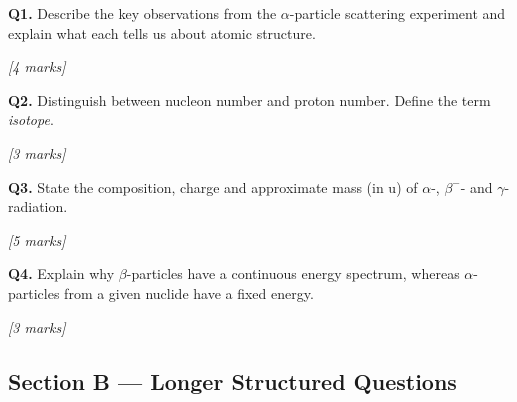 \begin{tcolorbox}[colback=white, colframe=midblue, breakable]

\begin{minipage}{\linewidth}
\textbf{Q1.} Describe the key observations from the $\alpha$-particle scattering experiment and explain what each tells us about atomic structure.
\par\hfill\textit{[4 marks]}
\vspace{4cm}
\end{minipage}

\begin{minipage}{\linewidth}
\textbf{Q2.} Distinguish between nucleon number and proton number. Define the term \textit{isotope}.
\par\hfill\textit{[3 marks]}
\vspace{3cm}
\end{minipage}

\begin{minipage}{\linewidth}
\textbf{Q3.} State the composition, charge and approximate mass (in u) of $\alpha$-, $\beta^-$- and $\gamma$-radiation.
\par\hfill\textit{[5 marks]}
\vspace{4.5cm}
\end{minipage}

\begin{minipage}{\linewidth}
\textbf{Q4.} Explain why $\beta$-particles have a continuous energy spectrum, whereas $\alpha$-particles from a given nuclide have a fixed energy.
\par\hfill\textit{[3 marks]}
\vspace{3.5cm}
\end{minipage}

\end{tcolorbox}

\subsection*{Section B — Longer Structured Questions}

